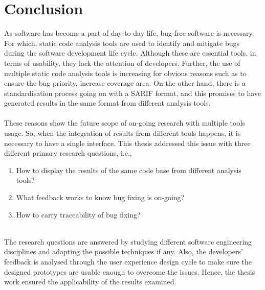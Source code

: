 \chapter{Conclusion}
\label{ch:conclusion_report}

As software has become a part of day-to-day life, bug-free software is necessary. For which, static code analysis tools are used to identify and mitigate bugs during the software development life cycle. Although these are essential tools, in terms of usability, they lack the attention of developers. Further, the use of multiple static code analysis tools is increasing for obvious reasons such as to ensure the bug priority, increase coverage area. On the other hand, there is a standardisation process going on with a SARIF format, \cite{sarif-git} and this promises to have generated results in the same format from different analysis tools. \\ \\

These reasons show the future scope of on-going research with multiple tools usage. So, when the integration of results from different tools happens, it is necessary to have a single interface. This thesis addressed this issue with three different primary research questions, i.e., \\ 

\begin{enumerate}
\item  How to display the results of the same code base from different analysis tools?
\item  What feedback works to know bug fixing is on-going?
\item  How to carry traceability of bug fixing? \\ \\

\end{enumerate}
The research questions are answered by studying different software engineering disciplines and adapting the possible techniques if any. Also, the developers’ feedback is analysed through the user experience design cycle to make sure the designed prototypes are usable enough to overcome the issues. Hence, the thesis work ensured the applicability of the results examined. \\ \\

